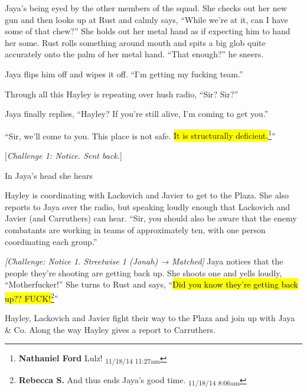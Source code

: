 Jaya's being eyed by the other members of the squad.  She checks out her new gun and then looks up at Rust and calmly says, ``While we're at it, can I have some of that chew?''  She holds out her metal hand as if expecting him to hand her some.  Rust rolls something around mouth and spits a big glob quite accurately onto the palm of her metal hand.  ``That enough?'' he sneers.  

Jaya flips him off and wipes it off.  ``I'm getting my fucking team.''



Through all this Hayley is repeating over hush radio, ``Sir?  Sir?''

Jaya finally replies, ``Hayley?  If you're still alive, I'm coming to get you.''

``Sir, we'll come to you.  This place is not safe. \hl{It is structurally deficient.}\footnote{\textbf{Nathaniel Ford }Lulz! \textsubscript{11/18/14 11:27am}}''

{[}\textit{Challenge 1: Notice.  Sent back.}{]}

In Jaya's head she hears  



Hayley is coordinating with Lackovich and Javier to get to the Plaza.  She also reports to Jaya over the radio, but speaking loudly enough that Lackovich and Javier (and Carruthers) can hear.  ``Sir, you should also be aware that the enemy combatants are working in teams of approximately ten, with one person coordinating each group.''



\textit{{[}Challenge: Notice 1.  Streetwise 1 (Jonah) → Matched{]}  }Jaya notices that the people they're shooting are getting back up.  She shoots one and yells loudly, ``Motherfucker!''  She turns to Rust and says, ``\hl{Did you know they're getting back up?? FUCK!}\footnote{\textbf{Rebecca S. }And thus ends Jaya's good time. \textsubscript{11/18/14 8:06am}}''



Hayley, Lackovich and Javier fight their way to the Plaza and join up with Jaya \& Co.  Along the way Hayley gives a report to Carruthers.    {\color[RGB]{255,153,0} } 

